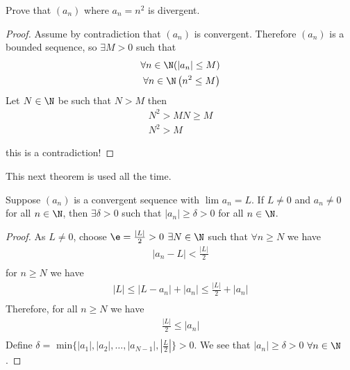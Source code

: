 
\begin{eg}
	Prove that $\left( a_n \right) $ where $a_n = n^{2}$ is divergent.
\end{eg}

\begin{proof}
	Assume by contradiction that $\left( a_n \right) $ is convergent. Therefore $\left( a_n \right) $ is a bounded sequence, so $\exists M > 0$ such that 
	\begin{align}
		\forall n \in \N (\left|a_n\right| \le M)\\
		\forall n \in \N \left( n^{2} \le M \right) \\
	\end{align}
	Let $N \in \N$ be such that $N > M$ then
	\begin{align}
		N^{2} > MN \ge M \\
		N^{2} > M
	\end{align}

	this is a contradiction!
\end{proof}

This next theorem is used all the time.

\begin{theorem}
	Suppose $\left( a_n \right) $ is a convergent sequence with $\lim_{} a_n = L$. If $L\neq 0$ and $a_n\neq 0$ for all $n \in \N$, then $\exists \delta > 0$ such that $\left|a_n\right| \ge \delta > 0$ for all $n \in \N$.
\end{theorem}

\begin{proof}
	As $L \neq 0$, choose $\e = \frac{\left|L\right|}{2} > 0$ $\exists N \in \N$ such that $\forall n \ge N$ we have
	\begin{align}
		\left|a_n - L\right| < \frac{\left|L\right|}{2}\\
	\end{align}
	for $n \ge N$ we have
	\begin{align}
		\left|L\right| \le \left|L - a_n\right| + \left|a_n\right| \le \frac{\left|L\right|}{2} + \left|a_n\right|\\
	\end{align}
	Therefore, for all $n \ge N$ we have
	\begin{align}
		\frac{\left|L\right|}{2} \le \left|a_n\right| \\
	\end{align}
	Define $\delta = \text{ min}\{\left|a_1\right|, \left|a_2\right|, \ldots, \left|a_{N-1}\right|, \left|\frac{L}{2}\right|\} > 0$. We see that  $\left|a_n\right| \ge \delta > 0$ $\forall n \in \N$.
\end{proof}

